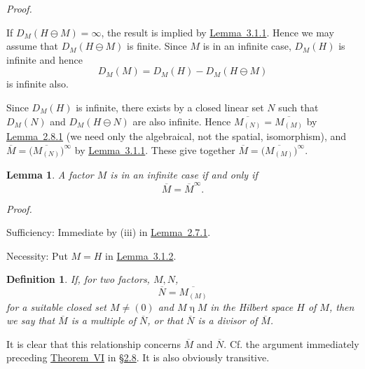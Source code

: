 \documentclass[b5paper,twoside]{article}
\newcommand{\secref}[2]{\hyperref[#1]{\mbox{\S#2}}}
\newcommand{\thmref}[2]{\hyperref[#1]{\mbox{Theorem~#2}}}
\newcommand{\lemref}[2]{\hyperref[#1]{\mbox{Lemma~#2}}}
\theoremstyle{mvnplain}
\newtheorem{lemma}{Lemma}[section]
\newtheorem{definition}{Definition}[section]
\renewenvironment{proof}[1][Proof]{%
  \par\addvspace{0.35\baselineskip}%
  \noindent\textit{#1.}\ \normalfont\ignorespaces
}{%
  \par\addvspace{0.35\baselineskip}%
}
\newcommand{\M}{\mathbf M}
\newcommand{\N}{\mathbf N}
\newcommand{\Hilbert}{\mathfrak H}
\def\M{M}%
\def\N{N}%
\def\Hilbert{H}%
\def\mathfrak#1{#1}%
\begin{document}
\begin{proof}
If \(D_{\M}(\Hilbert\ominus\mathfrak M)=\infty\), the result is implied by
\lemref{lem:3.1.1}{3.1.1}. Hence we may assume that
\(D_{\M}(\Hilbert\ominus\mathfrak M)\) is finite. Since \(\M\) is in an
infinite case, \(D_{\M}(\Hilbert)\) is infinite and hence
\[
  D_{\M}(\mathfrak M)=D_{\M}(\Hilbert)
    -D_{\M}(\Hilbert\ominus\mathfrak M)
\]
is infinite also.

Since \(D_{\M}(\Hilbert)\) is infinite, there exists by
\cite[p.~157, Lemma~7.2.3]{ref5} a closed linear set \(\mathfrak N\) such
that \(D_{\M}(\mathfrak N)\) and
\(D_{\M}(\Hilbert\ominus\mathfrak N)\) are also infinite. Hence
\(\overline{\M_{(\mathfrak N)}}=\overline{\M_{(\mathfrak M)}}\) by
\lemref{lem:2.8.1}{2.8.1} (we need only the algebraical, not the spatial,
isomorphism), and
\(\overline{\M}=\bigl(\overline{\M_{(\mathfrak N)}}\bigr)^\infty\) by
\lemref{lem:3.1.1}{3.1.1}. These give together
\(\overline{\M}=\bigl(\overline{\M_{(\mathfrak M)}}\bigr)^\infty\).
\end{proof}

\begin{lemma}\label{lem:3.1.3}
A factor \(\M\) is in an infinite case if and only if
\[
  \overline{\M}=\overline{\M}^{\infty}.
\]
\end{lemma}

\begin{proof}
Sufficiency: Immediate by (iii) in \lemref{lem:2.7.1}{2.7.1}.

Necessity: Put \(\mathfrak M=\Hilbert\) in \lemref{lem:3.1.2}{3.1.2}.
\end{proof}

\begin{definition}\label{def:3.1.1}
If, for two factors, \(\M,\N\),
\[
  \overline{\N}=\overline{\M_{(\mathfrak M)}}
\]
for a suitable closed set \(\mathfrak M\ne(0)\) and
\(\mathfrak M\mathrel{\eta}\M\) in the Hilbert space \(\Hilbert\) of \(\M\), then we
say that \(\overline{\M}\) is a \emph{multiple} of \(\overline{\N}\), or that
\(\overline{\N}\) is a \emph{divisor} of \(\overline{\M}\).
\end{definition}

It is clear that this relationship concerns \(\overline{\M}\) and
\(\overline{\N}\). Cf. the argument immediately preceding
\thmref{thm:VI}{VI} in \secref{sec:2.8}{2.8}. It is also obviously transitive.
\end{document}
